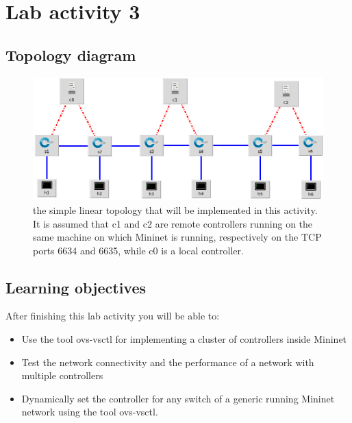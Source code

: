





\section*{Lab activity 3}
\subsection*{Topology diagram}
\begin{figure}[htb]
	\centering
	\includegraphics[width=1\linewidth]{img/topology-3.png}
	\caption{the simple linear topology that will be implemented in this activity. It is
  assumed that c1 and c2 are remote controllers running on the same machine
  on which Mininet is running, respectively on the TCP ports 6634 and 6635,
  while c0 is a local controller.}
	\label{fig:topology-3}
\end{figure}







\subsection*{Learning objectives}
After finishing this lab activity you will be able to:
\begin{itemize}
  \item Use the tool ovs-vsctl for implementing a cluster of controllers inside Mininet
  \item Test the network connectivity and the performance of a network with multiple
  controllers
  \item Dynamically set the controller for any switch of a generic running Mininet
  network using the tool ovs-vsctl.
\end{itemize}






